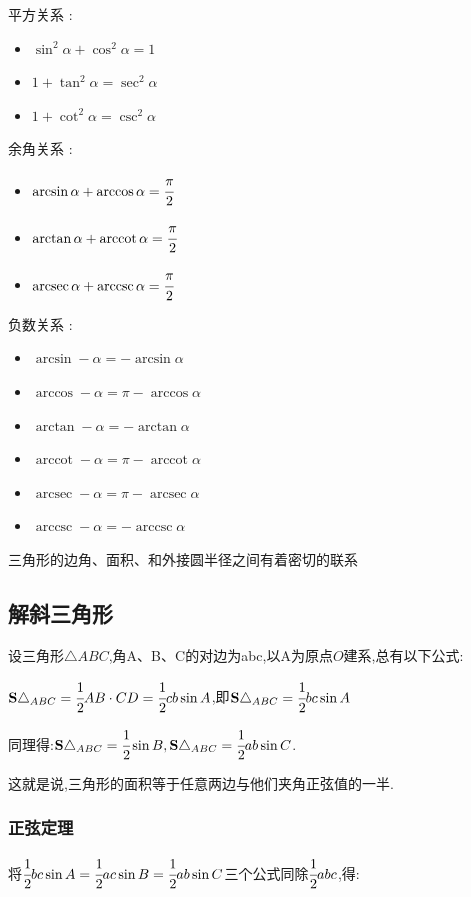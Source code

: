 \documentclass[UTF8,12pt]{ctexbook}
\DeclareMathOperator{\arccot}{arccot}
\DeclareMathOperator{\arcsec}{arcsec}
\DeclareMathOperator{\arccsc}{arccsc}
\begin{document}
{{{  平方关系 :
  \begin{itemize}
    \item $\sin^2\alpha + \cos^2\alpha = 1$
    \item $1 + \tan^2\alpha = \sec^2\alpha$
    \item $1 + \cot^2\alpha = \csc^2\alpha$
  \end{itemize}

  余角关系 :
  \begin{itemize}
    \item $\arcsin\alpha + \arccos\alpha = \cfrac{\pi}{2}$
    \item $\arctan\alpha + \arccot\alpha = \cfrac{\pi}{2}$
    \item $\arcsec\alpha + \arccsc\alpha = \cfrac{\pi}{2}$
  \end{itemize}

  负数关系 :
  \begin{itemize}
    \item $\arcsin-\alpha = -\arcsin\alpha$
    \item $\arccos-\alpha = \pi - \arccos\alpha$
    \item $\arctan-\alpha = -\arctan\alpha$
    \item $\arccot-\alpha = \pi - \arccot\alpha$
    \item $\arcsec-\alpha = \pi - \arcsec\alpha$
    \item $\arccsc-\alpha = -\arccsc\alpha$
  \end{itemize}

}%

三角形的边角、面积、和外接圆半径之间有着密切的联系

\subsection{解斜三角形}{
设三角形$\triangle ABC$,角A、B、C的对边为abc,以A为原点$O$建系,总有以下公式:

$\mathbf{S}\triangle_{ABC} = \cfrac{1}{2}AB \cdot CD = \cfrac{1}{2}cb\sin A$,即$\mathbf{S}\triangle_{ABC} = \cfrac{1}{2}bc\sin A$

同理得:$\mathbf{S}\triangle_{ABC} = \cfrac{1}{2}\sin B, \mathbf{S}\triangle_{ABC} = \cfrac{1}{2}ab\sin C$.

这就是说,三角形的面积等于任意两边与他们夹角正弦值的一半.

\subsubsection{正弦定理}
将$\cfrac{1}{2}bc\sin A = \cfrac{1}{2}ac\sin B = \cfrac{1}{2}ab\sin C$三个公式同除$\cfrac{1}{2}abc$,得:

}}}
\end{document}
